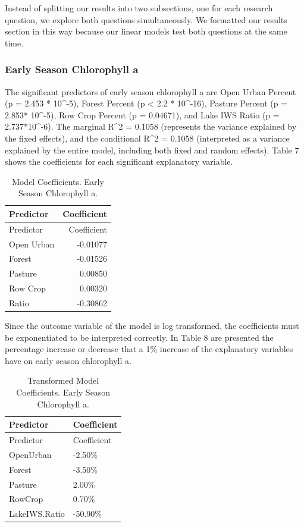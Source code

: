 \documentclass[12pt,]{article}
\begin{document}
Instead of splitting our results into two subsections, one for each
research question, we explore both questions simultaneously. We
formatted our results section in this way because our linear models test
both questions at the same time.

\hypertarget{early-season-chlorophyll-a}{%
\subsubsection{Early Season Chlorophyll
a}\label{early-season-chlorophyll-a}}

The significant predictors of early season chlorophyll a are Open Urban
Percent (p = 2.453 * 10\^{}-5), Forest Percent (p \textless{} 2.2 *
10\^{}-16), Pasture Percent (p = 2.853* 10\^{}-5), Row Crop Percent (p =
0.04671), and Lake IWS Ratio (p = 2.737*10\^{}-6). The marginal R\^{}2 =
0.1058 (represents the variance explained by the fixed effects), and the
conditional R\^{}2 = 0.1058 (interpreted as a variance explained by the
entire model, including both fixed and random effects). Table 7 shows
the coefficients for each significant explanatory variable.

\begin{longtable}[]{@{}lr@{}}
\caption{Model Coefficients. Early Season Chlorophyll a.}\tabularnewline
\toprule
Predictor & Coefficient\tabularnewline
\midrule
\endfirsthead
\toprule
Predictor & Coefficient\tabularnewline
\midrule
\endhead
Open Urban & -0.01077\tabularnewline
Forest & -0.01526\tabularnewline
Pasture & 0.00850\tabularnewline
Row Crop & 0.00320\tabularnewline
Ratio & -0.30862\tabularnewline
\bottomrule
\end{longtable}

Since the outcome variable of the model is log transformed, the
coefficients must be exponentiated to be interpreted correctly. In Table
8 are presented the percentage increase or decrease that a 1\% increase
of the explanatory variables have on early season chlorophyll a.

\begin{longtable}[]{@{}ll@{}}
\caption{Transformed Model Coefficients. Early Season Chlorophyll
a.}\tabularnewline
\toprule
Predictor & Coefficient\tabularnewline
\midrule
\endfirsthead
\toprule
Predictor & Coefficient\tabularnewline
\midrule
\endhead
OpenUrban & -2.50\%\tabularnewline
Forest & -3.50\%\tabularnewline
Pasture & 2.00\%\tabularnewline
RowCrop & 0.70\%\tabularnewline
LakeIWS.Ratio & -50.90\%\tabularnewline
\bottomrule
\end{longtable}
\end{document}
